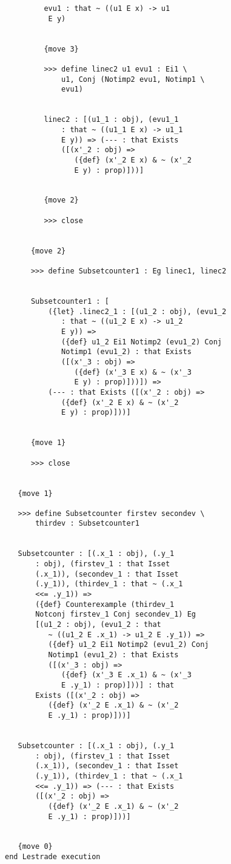 \documentclass[12pt]{article}
\begin{document}
\begin{verbatim}
         evu1 : that ~ ((u1 E x) -> u1 
          E y)


         {move 3}

         >>> define linec2 u1 evu1 : Ei1 \
             u1, Conj (Notimp2 evu1, Notimp1 \
             evu1)


         linec2 : [(u1_1 : obj), (evu1_1 
             : that ~ ((u1_1 E x) -> u1_1 
             E y)) => (--- : that Exists 
             ([(x'_2 : obj) => 
                ({def} (x'_2 E x) & ~ (x'_2 
                E y) : prop)]))]


         {move 2}

         >>> close


      {move 2}

      >>> define Subsetcounter1 : Eg linec1, linec2


      Subsetcounter1 : [
          ({let} .linec2_1 : [(u1_2 : obj), (evu1_2 
             : that ~ ((u1_2 E x) -> u1_2 
             E y)) => 
             ({def} u1_2 Ei1 Notimp2 (evu1_2) Conj 
             Notimp1 (evu1_2) : that Exists 
             ([(x'_3 : obj) => 
                ({def} (x'_3 E x) & ~ (x'_3 
                E y) : prop)]))]) => 
          (--- : that Exists ([(x'_2 : obj) => 
             ({def} (x'_2 E x) & ~ (x'_2 
             E y) : prop)]))]


      {move 1}

      >>> close


   {move 1}

   >>> define Subsetcounter firstev secondev \
       thirdev : Subsetcounter1


   Subsetcounter : [(.x_1 : obj), (.y_1 
       : obj), (firstev_1 : that Isset 
       (.x_1)), (secondev_1 : that Isset 
       (.y_1)), (thirdev_1 : that ~ (.x_1 
       <<= .y_1)) => 
       ({def} Counterexample (thirdev_1 
       Notconj firstev_1 Conj secondev_1) Eg 
       [(u1_2 : obj), (evu1_2 : that 
          ~ ((u1_2 E .x_1) -> u1_2 E .y_1)) => 
          ({def} u1_2 Ei1 Notimp2 (evu1_2) Conj 
          Notimp1 (evu1_2) : that Exists 
          ([(x'_3 : obj) => 
             ({def} (x'_3 E .x_1) & ~ (x'_3 
             E .y_1) : prop)]))] : that 
       Exists ([(x'_2 : obj) => 
          ({def} (x'_2 E .x_1) & ~ (x'_2 
          E .y_1) : prop)]))]


   Subsetcounter : [(.x_1 : obj), (.y_1 
       : obj), (firstev_1 : that Isset 
       (.x_1)), (secondev_1 : that Isset 
       (.y_1)), (thirdev_1 : that ~ (.x_1 
       <<= .y_1)) => (--- : that Exists 
       ([(x'_2 : obj) => 
          ({def} (x'_2 E .x_1) & ~ (x'_2 
          E .y_1) : prop)]))]


   {move 0}
end Lestrade execution
\end{verbatim}
\end{document}
